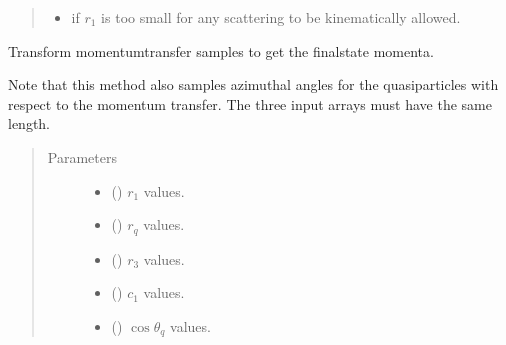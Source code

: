 \documentclass[letterpaper,10pt,english]{sphinxmanual}
\begin{document}
\begin{fulllineitems}
\begin{fulllineitems}
\begin{quote}
\begin{description}
\begin{itemize}
\item {} 
 \textendash{} if \(r_1\) is too small for any scattering to be
    kinematically allowed.

\end{itemize}

\end{description}\end{quote}

\end{fulllineitems}


\begin{fulllineitems}
\label{\detokenize{code_structure:scdc.initial.distribution.integral.InitialSampler.q_to_p}}
Transform momentum\sphinxhyphen{}transfer samples to get the final\sphinxhyphen{}state momenta.

Note that this method also samples azimuthal angles for the
quasiparticles with respect to the momentum transfer. The three input
arrays must have the same length.
\begin{quote}\begin{description}
\item[{Parameters}] \leavevmode\begin{itemize}
\item {} 
 () \textendash{} \(r_1\) values.

\item {} 
 () \textendash{} \(r_q\) values.

\item {} 
 () \textendash{} \(r_3\) values.

\item {} 
 () \textendash{} \(c_1\) values.

\item {} 
 () \textendash{} \(\cos\theta_q\) values.


\end{itemize}
\end{description}
\end{quote}
\end{fulllineitems}
\end{fulllineitems}
\end{document}
